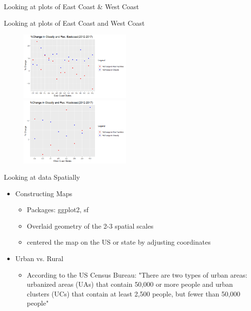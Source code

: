 \documentclass{beamer} %
\begin{document}
\begin{frame}{Looking at plots of East Coast & West Coast}
\begin{frame}{Looking at plots of East Coast and West Coast}
  \begin{figure}
   \includegraphics[width=0.5\textwidth]{Eastplot.png}
   \hfill
   \includegraphics[width=0.5\textwidth]{Westplot.png}
  \end{figure}
\end{frame}



\begin{frame}{Looking at data Spatially}
\begin{itemize}
    \item Constructing Maps
        \begin{itemize}
            \item Packages: ggplot2, sf
            \item Overlaid geometry of the 2-3 spatial scales
            \item centered the map on the US or state by adjusting coordinates
        \end{itemize}
    \item Urban vs. Rural
        \begin{itemize}
            \item According to the US Census Bureau: "There are two types of urban areas: urbanized areas (UAs) that contain 50,000 or more people and urban clusters (UCs) that contain at least 2,500 people, but fewer than 50,000 people"
        \end{itemize}
\end{itemize}
\end{frame}


\end{frame}
\end{document}
